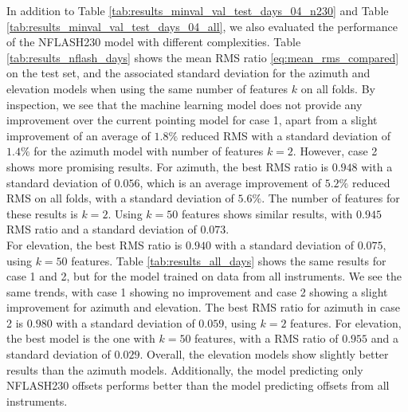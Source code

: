 In addition to Table \ref{tab:results_minval_val_test_days_04_n230} and Table \ref{tab:results_minval_val_test_days_04_all},
we also evaluated the performance of the NFLASH230 model with different complexities.
Table \ref{tab:results_nflash_days} shows the mean RMS ratio \eqref{eq:mean_rms_compared} on the test set,
and the associated standard deviation for the azimuth and elevation models when using the same number of features $k$ on all folds.
By inspection, we see that the machine learning model does not provide any improvement over the current pointing model for case 1, apart from a slight improvement of an average of $1.8\%$ reduced RMS with a standard deviation of $1.4\%$ for the azimuth model with number of features $k=2$.
However, case 2 shows more promising results.
For azimuth, the best RMS ratio is $0.948$ with a standard deviation of $0.056$, which is an average improvement of $5.2\%$ reduced RMS on all folds, with a standard deviation of $5.6\%$.
The number of features for these results is $k=2$.
Using $k=50$ features shows similar results, with $0.945$ RMS ratio and a standard deviation of $0.073$.\\

For elevation, the best RMS ratio is $0.940$ with a standard deviation of $0.075$, using $k=50$ features.
Table \ref{tab:results_all_days} shows the same results for case 1 and 2, but for the model trained on data from all instruments.
We see the same trends, with case 1 showing no improvement and case 2 showing a slight improvement for azimuth and elevation.
The best RMS ratio for azimuth in case 2 is $0.980$ with a standard deviation of $0.059$, using $k=2$ features.
For elevation, the best model is the one with $k=50$ features, with a RMS ratio of $0.955$ and a standard deviation of $0.029$.
Overall, the elevation models show slightly better results than the azimuth models.
Additionally, the model predicting only NFLASH230 offsets performs better than the model predicting offsets from all instruments. \\


